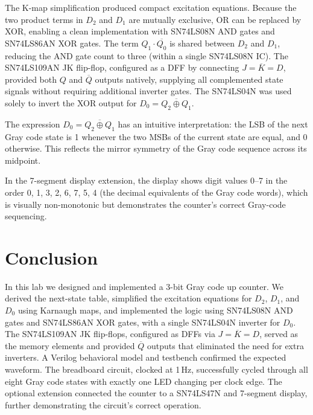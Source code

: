 \documentclass[12pt, letterpaper]{article}
\begin{document}
The K-map simplification produced compact excitation equations.  Because the two
product terms in $D_2$ and $D_1$ are mutually exclusive, OR can be replaced by XOR,
enabling a clean implementation with SN74LS08N AND gates and SN74LS86AN XOR gates.
The term $Q_1\cdot\overline{Q_0}$ is shared between $D_2$ and $D_1$, reducing the AND
gate count to three (within a single SN74LS08N IC).  The SN74LS109AN JK flip-flop,
configured as a DFF by connecting $J = \overline{K} = D$, provided both $Q$ and
$\overline{Q}$ outputs natively, supplying all complemented state signals without
requiring additional inverter gates.  The SN74LS04N was used solely to invert the XOR
output for $D_0 = \overline{Q_2 \oplus Q_1}$.

The expression $D_0 = \overline{Q_2 \oplus Q_1}$ has an intuitive interpretation: the
LSB of the next Gray code state is 1 whenever the two MSBs of the current state are
equal, and 0 otherwise.  This reflects the mirror symmetry of the Gray code sequence
across its midpoint.

In the 7-segment display extension, the display shows digit values 0--7 in the order 0,
1, 3, 2, 6, 7, 5, 4 (the decimal equivalents of the Gray code words), which is visually
non-monotonic but demonstrates the counter's correct Gray-code sequencing.

\section{Conclusion}

In this lab we designed and implemented a 3-bit Gray code up counter.  We derived the
next-state table, simplified the excitation equations for $D_2$, $D_1$, and $D_0$
using Karnaugh maps, and implemented the logic using SN74LS08N AND gates and SN74LS86AN
XOR gates, with a single SN74LS04N inverter for $D_0$.  The SN74LS109AN JK flip-flops,
configured as DFFs via $J = \overline{K} = D$, served as the memory elements and
provided $\overline{Q}$ outputs that eliminated the need for extra inverters.  A Verilog
behavioral model and testbench confirmed the expected waveform.  The breadboard circuit,
clocked at 1\,Hz, successfully cycled through all eight Gray code states with exactly
one LED changing per clock edge.  The optional extension connected the counter to a
SN74LS47N and 7-segment display, further demonstrating the circuit's correct operation.
\end{document}
